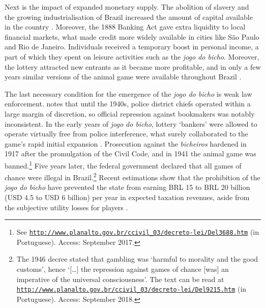 \documentclass[a4paper,12pt]{article}
\begin{document}
Next is the impact of expanded monetary supply. The abolition of slavery and the growing industrialisation of Brazil increased the amount of capital available in the country \citep{franco1987reformas, schulz2008financial}. Moreover, the 1888 Banking Act gave extra liquidity to local financial markets, what made credit more widely available in cities like São Paulo and Rio de Janeiro. Individuals received a temporary boost in personal income, a part of which they spent on leisure activities such as the \textit{jogo do bicho}. Moreover, the lottery attracted new entrants as it became more profitable, and in only a few years similar versions of the animal game were available throughout Brazil \citep[79]{da1999aguias}.  

The last necessary condition for the emergence of the \textit{jogo do bicho} is weak law enforcement. \citet[69--100]{chazkel2011laws} notes that until the 1940s, police district chiefs operated within a large margin of discretion, so official repression against bookmakers was notably inconsistent. In the early years of \textit{jogo do bicho}, lottery `bankers' were allowed to operate virtually free from police interference, what surely collaborated to the game's rapid initial expansion \citep[544]{chazkel2007beyond}. Prosecution against the \textit{bicheiros} hardened in 1917 after the promulgation of the Civil Code, and in 1941 the animal game was banned.\footnote{See \href{http://www.planalto.gov.br/ccivil_03/decreto-lei/Del3688.htm}{\texttt{http://www.planalto.gov.br/ccivil\_03/decreto-lei/Del3688.htm}} (in Portuguese). Access: September 2017.} Five years later, the federal government declared that all games of chance were illegal in Brazil.\footnote{The 1946 decree stated that gambling was `harmful to morality and the good customs', hence `[\dots] the repression against games of chance [was] an imperative of the universal consciousness'. The text can be read at \href{http://www.planalto.gov.br/ccivil_03/decreto-lei/Del9215.htm}{\texttt{http://www.planalto.gov.br/ccivil\_03/decreto-lei/Del9215.htm}} (in Portuguese). Access: September 2018.} Recent estimations show that the prohibition of the \textit{jogo do bicho} have prevented the state from earning BRL 15 to BRL 20 billion (USD 4.5 to USD 6 billion) per year in expected taxation revenues, aside from the subjective utility losses for players \citep{fsp2016legalizarbicho}.
\end{document}
